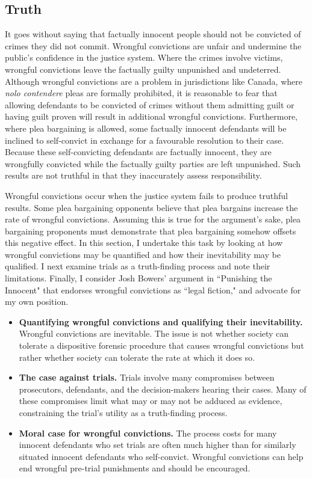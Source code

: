 \subsection{Truth}

It goes without saying that factually innocent people should not be convicted of crimes they did not commit. Wrongful convictions are unfair and undermine the public's confidence in the justice system. Where the crimes involve victims, wrongful convictions leave the factually guilty unpunished and undeterred. Although wrongful convictions are a problem in jurisdictions like Canada, where \textit{nolo contendere} pleas are formally prohibited, it is reasonable to fear that allowing defendants to be convicted of crimes without them admitting guilt or having guilt proven will result in additional wrongful convictions. Furthermore, where plea bargaining is allowed, some factually innocent defendants will be inclined to self-convict in exchange for a favourable resolution to their case. Because these self-convicting defendants are factually innocent, they are wrongfully convicted while the factually guilty parties are left unpunished. Such results are not truthful in that they inaccurately assess responsibility.

Wrongful convictions occur when the justice system fails to produce truthful results. Some plea bargaining opponents believe that plea bargains increase the rate of wrongful convictions. Assuming this is true for the argument's sake, plea bargaining proponents must demonstrate that plea bargaining somehow offsets this negative effect. In this section, I undertake this task by looking at how wrongful convictions may be quantified and how their inevitability may be qualified. I next examine trials as a truth-finding process and note their limitations. Finally, I consider Josh Bowers' argument in ``Punishing the Innocent" that endorses wrongful convictions as ``legal fiction," and advocate for my own position.

\begin{itemize}
    \item \textbf{Quantifying wrongful convictions and qualifying their inevitability.} Wrongful convictions are inevitable. The issue is not whether society can tolerate a dispositive forensic procedure that causes wrongful convictions but rather whether society can tolerate the rate at which it does so.
    \item \textbf{The case against trials.} Trials involve many compromises between prosecutors, defendants, and the decision-makers hearing their cases. Many of these compromises limit what may or may not be adduced as evidence, constraining the trial's utility as a truth-finding process.
    \item \textbf{Moral case for wrongful convictions.} The process costs for many innocent defendants who set trials are often much higher than for similarly situated innocent defendants who self-convict. Wrongful convictions can help end wrongful pre-trial punishments and should be encouraged.
    
\end{itemize}


